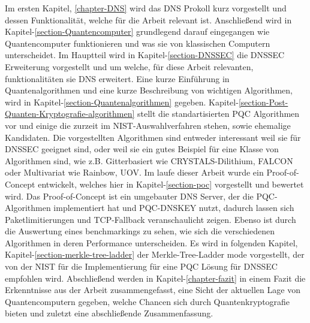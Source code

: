 Im ersten Kapitel, \ref{chapter-DNS} wird das DNS Prokoll kurz vorgestellt und dessen Funktionalität, welche für die Arbeit relevant ist.
Anschließend wird in Kapitel-\ref{section-Quantencomputer} grundlegend darauf eingegangen wie Quantencomputer funktionieren und was sie von klassischen Computern unterscheidet.
Im Hauptteil wird in Kapitel-\ref{section-DNSSEC} die DNSSEC Erweiterung vorgestellt und um welche, für diese Arbeit relevanten, funktionalitäten sie DNS erweitert.
Eine kurze Einführung in Quantenalgorithmen und eine kurze Beschreibung von wichtigen Algorithmen, wird in Kapitel-\ref{section-Quantenalgorithmen} gegeben.
Kapitel-\ref{section-Post-Quanten-Kryptografie-algorithmen} stellt die standartisierten PQC Algorithmen vor und einige die zurzeit im NIST-Auswahlverfahren stehen, sowie ehemalige Kandidaten.
Die vorgestellten Algorithmen sind entweder interessant weil sie für DNSSEC geeignet sind, oder weil sie ein gutes Beispiel für eine Klasse von Algorithmen sind, wie z.B. Gitterbasiert wie CRYSTALS-Dilithium, FALCON oder Multivariat wie Rainbow, UOV.
Im laufe dieser Arbeit wurde ein Proof-of-Concept entwickelt, welches hier in Kapitel-\ref{section-poc} vorgestellt und bewertet wird.
Das Proof-of-Concept ist ein umgebauter DNS Server, der die PQC-Algorithmen implementiert hat und PQC-DNSKEY nutzt, dadurch lassen sich Paketlimitierungen und TCP-Fallback veranschaulicht zeigen.
Ebenso ist durch die Auswertung eines benchmarkings zu sehen, wie sich die verschiedenen Algorithmen in deren Performance unterscheiden.
Es wird in folgenden Kapitel, Kapitel-\ref{section-merkle-tree-ladder} der Merkle-Tree-Ladder mode vorgestellt, der von der NIST für die Implementierung für eine PQC Lösung für DNSSEC empfohlen wird.
Abschließend werden in Kapitel-\ref{chapter-fazit} in einem Fazit die Erkenntnisse aus der Arbeit zusammengefasst, eine Sicht der aktuellen Lage von Quantencomputern gegeben, welche Chancen sich durch Quantenkryptografie bieten und zuletzt eine abschließende Zusammenfassung.